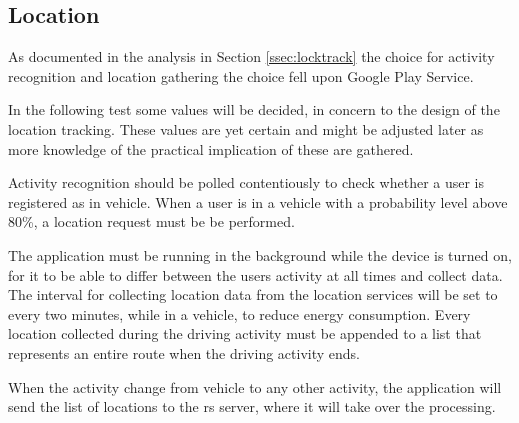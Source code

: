 \subsection{Location}
As documented in the analysis in Section \ref{ssec:locktrack} the choice for activity recognition and location gathering the choice fell upon Google Play Service.

In the following test some values will be decided, in concern to the design of the location tracking. 
These values are yet certain and might be adjusted later as more knowledge of the practical implication of these are gathered. 


Activity recognition should be polled contentiously to check whether a user is registered as in vehicle.
When a user is in a vehicle with a probability level above 80\%, a location request must be be performed.

The application must be running in the background while the device is turned on, for it to be able to differ between the users activity at all times and collect data. 
The interval for collecting location data from the location services will be set to every two minutes, while in a vehicle, to reduce energy consumption. 
Every location collected during the driving activity must be appended to a list that represents an entire route when the driving activity ends.

When the activity change from vehicle to any other activity, the application will send the list of locations to the \gls{rs} server, where it will take over the processing. 